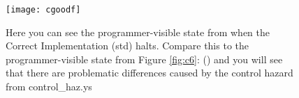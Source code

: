 \documentclass[12pt, letterpaper]{article}
\begin{document}
\begin{figure}[h]
  \texttt{[image: cgoodf]}
  \caption{Here you can see the programmer-visible state from when the Correct
Implementation (std) halts. Compare this to the programmer-visible state from
Figure \ref{fig:c6}: () and you will see that there are problematic differences caused by the control hazard from control\_haz.ys}
  \label{fig:cgoodf}
\end{figure}
\end{document}
